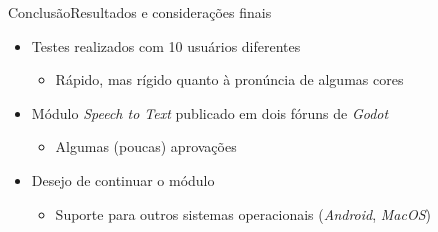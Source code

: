 \begin{frame}{Conclusão}{Resultados e considerações finais}

\begin{itemize}
\item Testes realizados com 10 usuários diferentes
\begin{itemize}
    \item<2-> Rápido, mas rígido quanto à pronúncia de algumas cores
\end{itemize}

\item<3-> Módulo \textit{Speech to Text} publicado em dois fóruns de \textit{Godot}
\begin{itemize}
  \item Algumas (poucas) aprovações
\end{itemize}

\item<4-> Desejo de continuar o módulo
\begin{itemize}
\item Suporte para outros sistemas operacionais (\textit{Android}, \textit{MacOS})
\end{itemize}

\end{itemize}
\end{frame}
